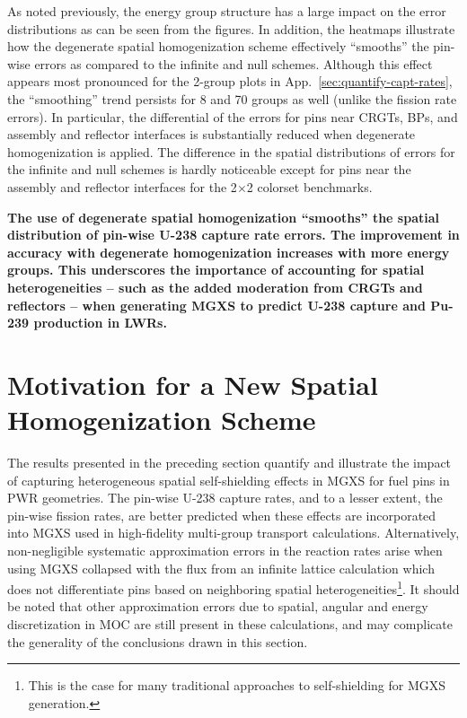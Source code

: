 \clearpage

As noted previously, the energy group structure has a large impact on the error distributions as can be seen from the figures. In addition, the heatmaps illustrate how the degenerate spatial homogenization scheme effectively ``smooths'' the pin-wise errors as compared to the infinite and null schemes. Although this effect appears most pronounced for the 2-group plots in App.~\ref{sec:quantify-capt-rates}, the ``smoothing'' trend persists for 8 and 70 groups as well (unlike the fission rate errors). In particular, the differential of the errors for pins near \acp{CRGT}, \acp{BP}, and assembly and reflector interfaces is substantially reduced when degenerate homogenization is applied. The difference in the spatial distributions of errors for the infinite and null schemes is hardly noticeable except for pins near the assembly and reflector interfaces for the 2$\times$2 colorset benchmarks.

\begin{emphbox}
\textbf{The use of degenerate spatial homogenization ``smooths'' the spatial distribution of pin-wise U-238 capture rate errors. The improvement in accuracy with degenerate homogenization increases with more energy groups. This underscores the importance of accounting for spatial heterogeneities -- such as the added moderation from \acp{CRGT} and reflectors -- when generating \ac{MGXS} to predict U-238 capture and Pu-239 production in \acp{LWR}.}
\end{emphbox}


\section{Motivation for a New Spatial Homogenization Scheme}
\label{sec:chap8-motivate}

The results presented in the preceding section quantify and illustrate the impact of capturing heterogeneous spatial self-shielding effects in \ac{MGXS} for fuel pins in \ac{PWR} geometries. The pin-wise U-238 capture rates, and to a lesser extent, the pin-wise fission rates, are better predicted when these effects are incorporated into \ac{MGXS} used in high-fidelity multi-group transport calculations. Alternatively, non-negligible systematic approximation errors in the reaction rates arise when using \ac{MGXS} collapsed with the flux from an infinite lattice calculation which does not differentiate pins based on neighboring spatial heterogeneities\footnote{This is the case for many traditional approaches to self-shielding for \ac{MGXS} generation.}. It should be noted that other approximation errors due to spatial, angular and energy discretization in \ac{MOC} are still present in these calculations, and may complicate the generality of the conclusions drawn in this section.


